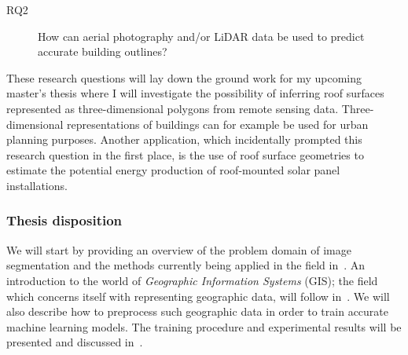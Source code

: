 \begin{description}
  \item[RQ2] How can aerial photography and/or LiDAR data be used to predict accurate building outlines?
\end{description}

These research questions will lay down the ground work for my upcoming master's thesis where I will investigate the possibility of inferring roof surfaces represented as three-dimensional polygons from remote sensing data.
Three-dimensional representations of buildings can for example be used for urban planning purposes.
Another application, which incidentally prompted this research question in the first place, is the use of roof surface geometries to estimate the potential energy production of roof-mounted solar panel installations.

\subsubsection*{Thesis disposition}

We will start by providing an overview of the problem domain of image segmentation and the methods currently being applied in the field in~.
An introduction to the world of \textit{Geographic Information Systems} (GIS); the field which concerns itself with representing geographic data, will follow in~.
We will also describe how to preprocess such geographic data in order to train accurate machine learning models.
The training procedure and experimental results will be presented and discussed in~.
